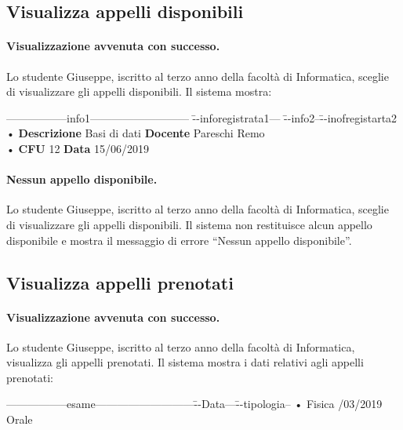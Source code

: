 \subsection{Visualizza appelli disponibili}
\paragraph{Visualizzazione avvenuta con successo.}
Lo studente Giuseppe, iscritto al terzo anno della facoltà di Informatica, sceglie di visualizzare gli appelli disponibili. Il sistema mostra:

 \begin{tabbing}
	\hspace{1cm}-----------------info1--------------------------- \= --inforegistrata1--- \= --info2--\=--inofregistarta2 \kill
	\hspace{1cm} • \textbf{Descrizione} Basi di dati \> \textbf{Docente} Pareschi Remo
	  \\
	\hspace{1cm} •  \textbf{CFU} 12  \> \textbf{Data} 15/06/2019 \\
\end{tabbing}

\paragraph{Nessun appello disponibile.}
Lo studente Giuseppe, iscritto al terzo anno della facoltà di Informatica, sceglie di visualizzare gli appelli disponibili. Il sistema non restituisce alcun appello disponibile e mostra il messaggio di errore “Nessun appello disponibile”.

\subsection{Visualizza appelli prenotati}
\paragraph{Visualizzazione avvenuta con successo.}
Lo studente Giuseppe, iscritto al terzo anno della facoltà di Informatica, visualizza gli appelli prenotati. Il sistema mostra i dati relativi agli appelli prenotati: 

 \begin{tabbing}
	\hspace{1cm}-----------------esame---------------------------\=--Data---\= --tipologia--\kill
	\hspace{1cm} • Fisica /03/2019 \> \hspace{1cm}Orale \\
\end{tabbing}

